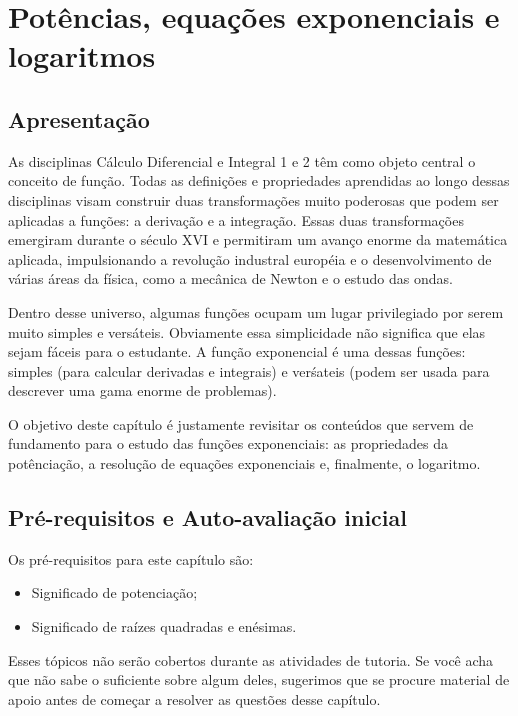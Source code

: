 \documentclass[main.tex]{subfiles}
\begin{document}
\chapter{Potências, equações exponenciais e logaritmos}

\paraAlunos

\section{Apresentação}

As disciplinas Cálculo Diferencial e Integral 1 e 2 têm como objeto central o conceito de função. Todas as definições e propriedades aprendidas ao longo dessas disciplinas visam construir duas transformações muito poderosas que podem ser aplicadas a funções: a derivação e a integração. Essas duas transformações emergiram durante o século XVI e permitiram um avanço enorme da matemática aplicada, impulsionando a revolução industral européia e o desenvolvimento de várias áreas da física, como a mecânica de Newton e o estudo das ondas.

Dentro desse universo, algumas funções ocupam um lugar privilegiado por serem muito simples e versáteis. Obviamente essa simplicidade não significa que elas sejam fáceis para o estudante. A função exponencial é uma dessas funções: simples (para calcular derivadas e integrais) e verśateis (podem ser usada para descrever uma gama enorme de problemas).

O objetivo deste capítulo é justamente revisitar os conteúdos que servem de fundamento para o estudo das funções exponenciais: as propriedades da potênciação, a resolução de equações exponenciais e, finalmente, o logaritmo.

\section{Pré-requisitos e Auto-avaliação inicial}

Os pré-requisitos para este capítulo são:
\begin{itemize}
 \item Significado de potenciação;
 \item Significado de raízes quadradas e enésimas.
\end{itemize}

Esses tópicos não serão cobertos durante as atividades de tutoria. Se você acha que não sabe o suficiente sobre algum deles, sugerimos que se procure material de apoio antes de começar a resolver as questões desse capítulo.
\end{document}
